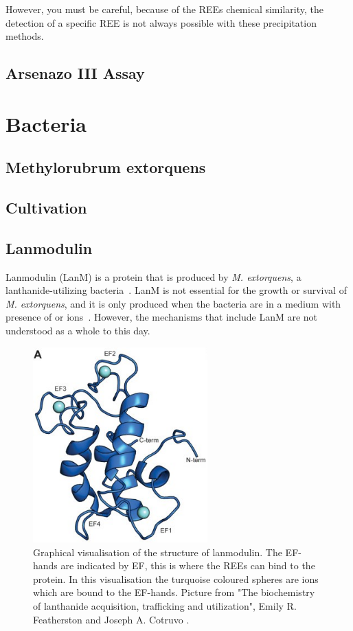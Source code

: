 However, you must be careful, because of the REEs chemical similarity, the detection of a specific REE is not always possible with these precipitation methods.

\subsection{Arsenazo III Assay}

\section{Bacteria\authorB{}}

\subsection{Methylorubrum extorquens}

\subsection{Cultivation}

\subsection{Lanmodulin\authorA}

Lanmodulin (LanM) is a protein that is produced by \textit{M. extorquens}, a lanthanide-utilizing bacteria~\cite{lanmdiscovery}.
LanM is not essential for the growth or survival of \textit{M. extorquens}, and it is only produced when the bacteria are in a medium with presence of  or  ions~\cite{lanmroleinbiology}.
However, the mechanisms that include LanM are not understood as a whole to this day.

\begin{figure}[H]
    \centering
    \includegraphics[width=0.6\textwidth]{./media/images/lanm_structure}
    \caption{Graphical visualisation of the structure of lanmodulin. The EF-hands are indicated by EF, this is where the REEs can bind to the protein. In this visualisation the turquoise coloured spheres are  ions which are bound to the EF-hands. Picture from "The biochemistry of lanthanide acquisition, trafficking and utilization", Emily R. Featherston and Joseph A. Cotruvo \cite{lanmroleinbiology}.}
    \label{fig:lanm_structure}
\end{figure}

